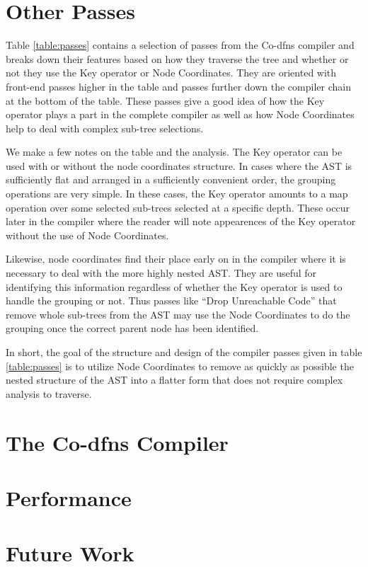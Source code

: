 \documentclass[numbers,preprint]{sigplanconf}
\begin{document}
\section{Other Passes}

Table \ref{table:passes} contains a selection of passes from the Co-dfns compiler 
and breaks down their features based on how they traverse the tree and whether 
or not they use the Key operator or Node Coordinates. They are oriented with 
front-end passes higher in the table and passes further down the compiler 
chain at the bottom of the table. These passes give a good idea of how the Key 
operator plays a part in the complete compiler as well as how Node Coordinates 
help to deal with complex sub-tree selections. 

We make a few notes on the table and the analysis. The Key operator can be used 
with or without the node coordinates structure. In cases where the AST is 
sufficiently flat and arranged in a sufficiently convenient order, the grouping 
operations are very simple. In these cases, the Key operator amounts to a 
map operation over some selected sub-trees selected at a specific depth. These 
occur later in the compiler where the reader will note appearences of the Key 
operator without the use of Node Coordinates. 

Likewise, node coordinates find their place early on in the compiler where it 
is necessary to deal with the more highly nested AST. They are useful for identifying 
this information regardless of whether the Key operator is used to handle the 
grouping or not. Thus passes like ``Drop Unreachable Code'' that remove whole 
sub-trees from the AST may use the Node Coordinates to do the grouping once 
the correct parent node has been identified. 

In short, the goal of the structure and design of the compiler passes given 
in table \ref{table:passes} is to utilize Node Coordinates to remove as quickly as possible 
the nested structure of the AST into a flatter form that does not require complex 
analysis to traverse. 
\section{The Co-dfns Compiler}
\section{Performance}
\section{Future Work}
\end{document}
